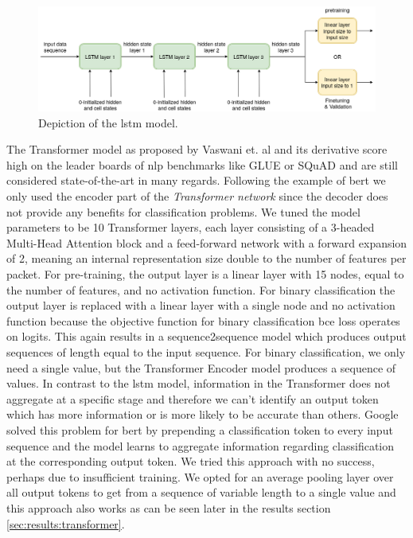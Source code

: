 \begin{figure}[h]
	\centering
	\includegraphics[width=0.95\linewidth]{graphics/img/lstm_model.png}
	\caption{Depiction of the \gls{lstm} model.}
	\label{fig:lstm_model}
\end{figure}

The Transformer model as proposed by Vaswani et. al \cite{attention} and its derivative score high on the leader boards of \gls{nlp} benchmarks like GLUE \cite{glue} or SQuAD \cite{bibid} and are still considered state-of-the-art in many regards. Following the example of \gls{bert} we only used the encoder part of the \textit{Transformer network} since the decoder does not provide any benefits for classification problems. We tuned the model parameters to be 10 Transformer layers, each layer consisting of a 3-headed Multi-Head Attention block and a feed-forward network with a forward expansion of 2, meaning an internal representation size double to the number of features per packet. For pre-training, the output layer is a linear layer with 15 nodes, equal to the number of features, and no activation function. For binary classification the output layer is replaced with a linear layer with a single node and no activation function because the objective function for binary classification \gls{bce} loss operates on logits. This again results in a sequence2sequence model which produces output sequences of length equal to the input sequence. For binary classification, we only need a single value, but the Transformer Encoder model produces a sequence of values. In contrast to the \gls{lstm} model, information in the Transformer does not aggregate at a specific stage and therefore we can't identify an output token which has more information or is more likely to be accurate than others. Google solved this problem for \gls{bert} by prepending a classification token to every input sequence and the model learns to aggregate information regarding classification at the corresponding output token. We tried this approach with no success, perhaps due to insufficient training. We opted for an average pooling layer over all output tokens to get from a sequence of variable length to a single value and this approach also works as can be seen later in the results section \ref{sec:results:transformer}.

